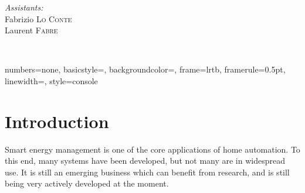 \begin{titlepage}
\begin{center}
\begin{minipage}{0.4\textwidth}
\begin{flushright}
        \emph{Assistants:} \\
        Fabrizio \textsc{Lo Conte}\\
        Laurent \textsc{Fabre}\\[0.5cm]
      \end{flushright}
    \end{minipage} \\[2cm]
     
    \vfill
     
    {\large \thedate}
     
  \end{center}

\end{titlepage}

\newpage{}

\fancyfoot{}
\lhead{}
\cfoot{\thepage}        %
\rfoot{\thedate} 


\setcounter{secnumdepth}{5}

\tableofcontents{}

\newpage

\lstset{language=C}

{
  numbers=none,
  basicstyle=\ttfamily\footnotesize,
  backgroundcolor=\color{grey97},
  frame=lrtb,
  framerule=0.5pt,
  linewidth=\textwidth,
}
{
  style=console
}

\lstset{
  style=console
}



\section*{Introduction}
Smart energy management is one of the core applications of home automation. To
this end, many systems have been developed, but not many are in widespread use.
It is still an emerging business which can benefit from research, and is still
being very actively developed at the moment.


